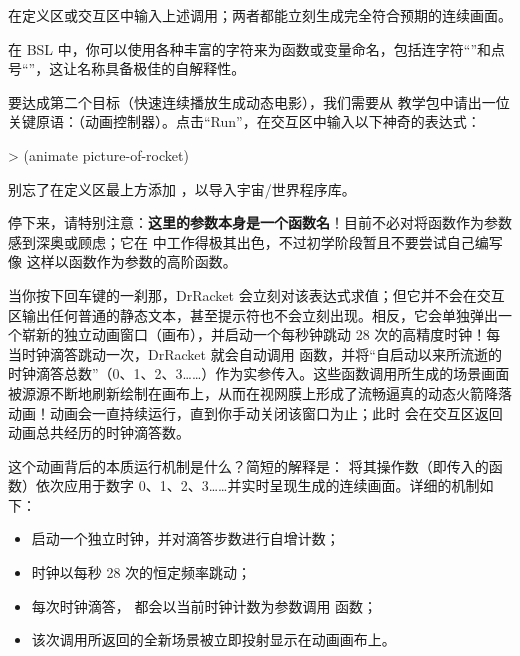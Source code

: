 在定义区或交互区中输入上述调用；两者都能立刻生成完全符合预期的连续画面。

\begin{notebox}
在 BSL 中，你可以使用各种丰富的字符来为函数或变量命名，包括连字符“\code{-}”和点号“”，这让名称具备极佳的自解释性。
\end{notebox}

要达成第二个目标（快速连续播放生成动态电影），我们需要从  教学包中请出一位关键原语：（动画控制器）。点击“Run”，在交互区中输入以下神奇的表达式：
\begin{replbox}
> (animate picture-of-rocket)
\end{replbox}

\begin{notebox}[引入动画教学包]
别忘了在定义区最上方添加 ，以导入宇宙/世界程序库。
\end{notebox}

停下来，请特别注意：\textbf{这里的参数本身是一个函数名}！目前不必对将函数作为参数感到深奥或顾虑；它在  中工作得极其出色，不过初学阶段暂且不要尝试自己编写像  这样以函数作为参数的高阶函数。

当你按下回车键的一刹那，DrRacket 会立刻对该表达式求值；但它并不会在交互区输出任何普通的静态文本，甚至提示符也不会立刻出现。相反，它会单独弹出一个崭新的独立动画窗口（画布），并启动一个每秒钟跳动 28 次的高精度时钟！每当时钟滴答跳动一次，DrRacket 就会自动调用  函数，并将“自启动以来所流逝的时钟滴答总数”（0、1、2、3……）作为实参传入。这些函数调用所生成的场景画面被源源不断地刷新绘制在画布上，从而在视网膜上形成了流畅逼真的动态火箭降落动画！动画会一直持续运行，直到你手动关闭该窗口为止；此时  会在交互区返回动画总共经历的时钟滴答数。

这个动画背后的本质运行机制是什么？简短的解释是： 将其操作数（即传入的函数）依次应用于数字 0、1、2、3……并实时呈现生成的连续画面。详细的机制如下：
\begin{itemize}
  \item {} 启动一个独立时钟，并对滴答步数进行自增计数；
  \item 时钟以每秒 28 次的恒定频率跳动；
  \item 每次时钟滴答， 都会以当前时钟计数为参数调用  函数；
  \item 该次调用所返回的全新场景被立即投射显示在动画画布上。
\end{itemize}

